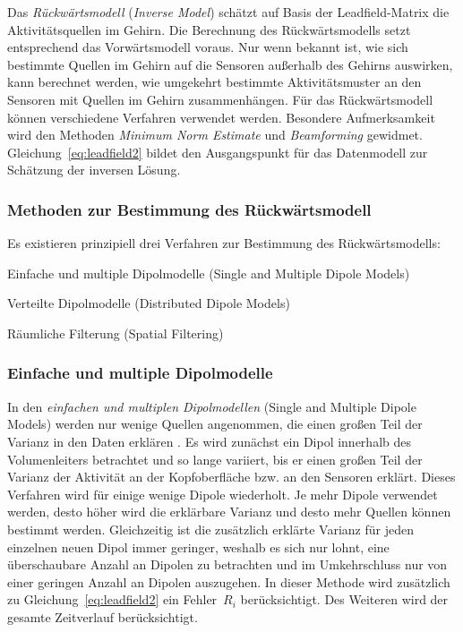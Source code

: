 \documentclass[doc,a4paper,12pt]{apa6}
\begin{document}
Das \emph{Rückwärtsmodell} (\emph{Inverse Model}) schätzt auf Basis der Leadfield-Matrix die Aktivitätsquellen im Gehirn. Die Berechnung des Rückwärtsmodells setzt entsprechend das Vorwärtsmodell voraus. Nur wenn bekannt ist, wie sich bestimmte Quellen im Gehirn auf die Sensoren außerhalb des Gehirns auswirken, kann berechnet werden, wie umgekehrt bestimmte Aktivitätsmuster an den Sensoren mit Quellen im Gehirn zusammenhängen. Für das Rückwärtsmodell können verschiedene Verfahren verwendet werden. Besondere Aufmerksamkeit wird den Methoden \emph{Minimum Norm Estimate} und \emph{Beamforming} gewidmet. Gleichung~\ref{eq:leadfield2} bildet den Ausgangspunkt für das Datenmodell zur Schätzung der inversen Lösung.

\subsubsection{Methoden zur Bestimmung des Rückwärtsmodell}

Es existieren prinzipiell drei Verfahren zur Bestimmung des Rückwärtsmodells:

\begin{compactitem}
\item Einfache und multiple Dipolmodelle (Single and Multiple Dipole Models)
\item Verteilte Dipolmodelle (Distributed Dipole Models)
\item Räumliche Filterung (Spatial Filtering)
\end{compactitem}

\subsubsection{Einfache und multiple Dipolmodelle}

In den \emph{einfachen und multiplen Dipolmodellen} (Single and Multiple Dipole Models) werden nur wenige Quellen angenommen, die einen großen Teil der Varianz in den Daten erklären \parencite{scherg1990fundamentals}. Es wird zunächst ein Dipol innerhalb des Volumenleiters betrachtet und so lange variiert, bis er einen großen Teil der Varianz der Aktivität an der Kopfoberfläche bzw. an den Sensoren erklärt. Dieses Verfahren wird für einige wenige Dipole wiederholt. Je mehr Dipole verwendet werden, desto höher wird die erklärbare Varianz und desto mehr Quellen können bestimmt werden. Gleichzeitig ist die zusätzlich erklärte Varianz für jeden einzelnen neuen Dipol immer geringer, weshalb es sich nur lohnt, eine überschaubare Anzahl an Dipolen zu betrachten und im Umkehrschluss nur von einer geringen Anzahl an Dipolen auszugehen. In dieser Methode wird zusätzlich zu Gleichung~\ref{eq:leadfield2} ein Fehler~$R_i$ berücksichtigt. Des Weiteren wird der gesamte Zeitverlauf berücksichtigt.
\end{document}
